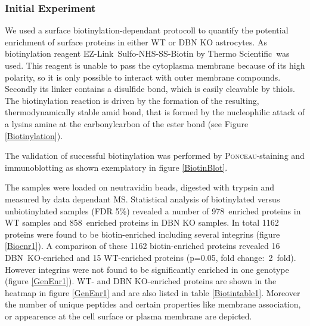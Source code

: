 \documentclass[a4paper,11pt,bibtotocnumbered]{article}
\begin{document}
\subsubsection{Initial Experiment}

We used a surface biotinylation-dependant protocoll to quantify the potential enrichment of surface proteins in either WT or DBN KO astrocytes. As biotinylation reagent EZ-Link\texttrademark \ Sulfo-NHS-SS-Biotin by Thermo Scientific\texttrademark \ was used. This reagent is unable to pass the cytoplasma membrane because of its high polarity, so it is only possible to interact with outer membrane compounds. Secondly its linker contains a disulfide bond, which is easily cleavable by thiols. The biotinylation reaction is driven by the formation of the resulting, thermodynamically stable amid bond, that is formed by the nucleophilic attack of a lysins amine at the carbonylcarbon of the ester bond (see Figure \ref{Biotinylation}).    


The validation of successful biotinylation was performed by \textsc{Ponceau}-staining and immunoblotting as shown exemplatory in figure \ref{BiotinBlot}.

 




The samples were loaded on neutravidin beads, digested with trypsin and measured by data dependant MS. Statistical analysis of biotinylated versus unbiotinylated samples (FDR 5\%) revealed a number of 978~enriched proteins in WT samples and 858~enriched proteins in DBN KO samples. In total 1162 proteins were found to be biotin-enriched including several integrins (figure \ref{Bioenr1}). A comparison of these 1162 biotin-enriched proteins revealed 16 DBN~KO-enriched and 15 WT-enriched proteins (p=0.05, fold change:~2~fold). However integrins were not found to be significantly enriched in one genotype (figure \ref{GenEnr1}). WT- and DBN KO-enriched proteins are shown in the heatmap in figure \ref{GenEnr1} and are also listed in table \ref{Biotintable1}. Moreover the number of unique peptides and certain properties like membrane association, or appearence at the cell surface or plasma membrane are depicted.    
\end{document}
